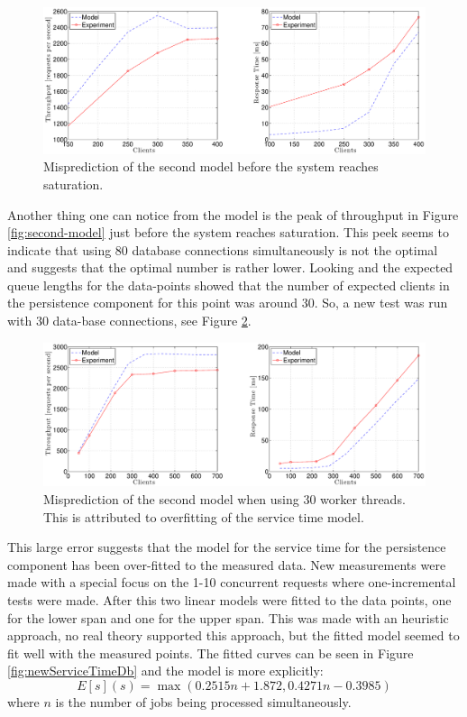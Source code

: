 \documentclass[a4paper, 11pt]{article}
\begin{document}
	\FloatBarrier
	\begin{figure}[cht!]
		\centering
			\includegraphics[width=1\linewidth,keepaspectratio]{secondRealAndModelError}
		\caption{Misprediction of the second model before the system reaches saturation.}
		\label{fig:secondmodelResults-error}
	\end{figure}
	\FloatBarrier

	Another thing one can notice from the model is the peak of throughput in Figure \ref{fig:second-model} just before the system reaches saturation. This peek seems to indicate that using 80 database connections simultaneously is not the optimal and suggests that the optimal number is rather lower. Looking and the expected queue lengths for the data-points showed that the number of expected clients in the persistence component for this point was around 30. So, a new test was run with 30 data-base connections, see Figure \ref{fig:secondRealAndModel30th}. 

	\FloatBarrier
	\begin{figure}[cht!]
		\centering
			\includegraphics[width=1\linewidth,keepaspectratio]{secondRealAndModel30th}
		\caption{Misprediction of the second model when using 30 worker threads. This is attributed to overfitting of the service time model.}
		\label{fig:secondRealAndModel30th}
	\end{figure}
	\FloatBarrier

	This large error suggests that the model for the service time for the persistence component has been over-fitted to the measured data. New measurements were made with a special focus on the 1-10 concurrent requests where one-incremental tests were made. After this two linear models were fitted to the data points, one for the lower span and one for the upper span. This was made with an heuristic approach, no real theory supported this approach, but the fitted model seemed to fit well with the measured points. The fitted curves can be seen in Figure \ref{fig:newServiceTimeDb} and the model is more explicitly:
		\[ E[s](s) = \max\left(0.2515n+1.872, 0.4271n -0.3985\right) \]
	where $n$ is the number of jobs being processed simultaneously.
\end{document}
